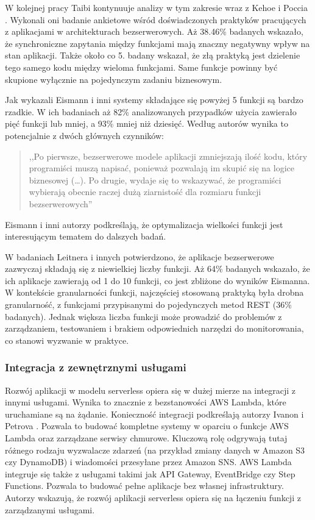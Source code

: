 W kolejnej pracy Taibi kontynuuje analizy w tym zakresie wraz z Kehoe i Poccia \cite{9912641}. 
Wykonali oni badanie ankietowe wśród doświadczonych praktyków pracujących z aplikacjami w architekturach bezserwerowych.
Aż 38.46\% badanych wskazało, że synchroniczne zapytania między funkcjami mają znaczny negatywny wpływ na stan aplikacji.
Także około co 5. badany wskazał, że złą praktyką jest dzielenie tego samego kodu między wieloma funkcjami.
Same funkcje powinny być skupione wyłącznie na pojedynczym zadaniu biznesowym.

Jak wykazali Eismann i inni \cite{eismann2021reviewserverlessusecases} systemy składające się powyżej 5 funkcji są bardzo rzadkie.
W ich badaniach aż 82\% analizowanych przypadków użycia zawierało pięć funkcji lub mniej, a 93\% mniej niż dziesięć. 
Według autorów wynika to potencjalnie z dwóch głównych czynników:
\begin{quote}
    ,,Po pierwsze, bezserwerowe modele aplikacji zmniejszają ilość kodu, który programiści muszą napisać, ponieważ pozwalają im skupić się na logice biznesowej (\dots). Po drugie, wydaje się to wskazywać, że programiści wybierają obecnie raczej dużą ziarnistość dla rozmiaru funkcji bezserwerowych'' \cite{eismann2021reviewserverlessusecases}
\end{quote}
Eismann i inni autorzy podkreślają, że optymalizacja wielkości funkcji jest interesującym tematem do dalszych badań.

W badaniach Leitnera i innych \cite{LEITNER2019340} potwierdzono, że aplikacje bezserwerowe zazwyczaj składają się z niewielkiej liczby funkcji.
Aż 64\% badanych wskazało, że ich aplikacje zawierają od 1 do 10 funkcji, co jest zbliżone do wyników Eismanna.
W kontekście granularności funkcji, najczęściej stosowaną praktyką była drobna granularność, z funkcjami przypisanymi do pojedynczych metod REST (36\% badanych).
Jednak większa liczba funkcji może prowadzić do problemów z zarządzaniem, testowaniem i brakiem odpowiednich narzędzi do monitorowania, co stanowi wyzwanie w praktyce.

\subsubsection*{Integracja z zewnętrznymi usługami}

Rozwój aplikacji w modelu serverless opiera się w dużej mierze na integracji z innymi usługami.
Wynika to znacznie z bezstanowości AWS Lambda, które uruchamiane są na żądanie.
Konieczność integracji podkreślają autorzy Ivanon i Petrova \cite{Ivanov_Petrova_2024}.
Pozwala to budować kompletne systemy w oparciu o funkcje AWS Lambda oraz zarządzane serwisy chmurowe.
Kluczową rolę odgrywają tutaj różnego rodzaju wyzwalacze zdarzeń (na przykład zmiany danych w Amazon S3 czy DynamoDB) i wiadomości przesyłane przez Amazon SNS.
AWS Lambda integruje się także z usługami takimi jak API Gateway, EventBridge czy Step Functions.
Pozwala to budować pełne aplikacje bez własnej infrastruktury.
Autorzy wskazują, że rozwój aplikacji serverless opiera się na łączeniu funkcji z zarządzanymi usługami.

